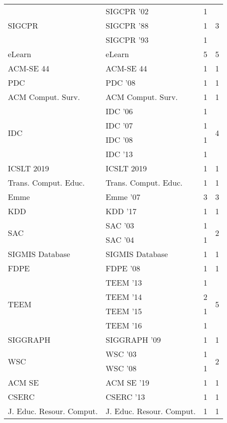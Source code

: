 \begin{table*}[t]
\begin{tabular}{llrr}
\multirow{3}{*}{SIGCPR } & SIGCPR '02 & 1 & \multirow{3}{*}{3}\\
& SIGCPR '88 & 1 &\\
& SIGCPR '93 & 1 &\\
\multirow{1}{*}{eLearn} & eLearn & 5 & \multirow{1}{*}{5}\\
\multirow{1}{*}{ACM-SE 44} & ACM-SE 44 & 1 & \multirow{1}{*}{1}\\
\multirow{1}{*}{PDC } & PDC '08 & 1 & \multirow{1}{*}{1}\\
\multirow{1}{*}{ACM Comput. Surv.} & ACM Comput. Surv. & 1 & \multirow{1}{*}{1}\\
\multirow{4}{*}{IDC } & IDC '06 & 1 & \multirow{4}{*}{4}\\
& IDC '07 & 1 &\\
& IDC '08 & 1 &\\
& IDC '13 & 1 &\\
\multirow{1}{*}{ICSLT 2019} & ICSLT 2019 & 1 & \multirow{1}{*}{1}\\
\multirow{1}{*}{Trans. Comput. Educ.} & Trans. Comput. Educ. & 1 & \multirow{1}{*}{1}\\
\multirow{1}{*}{Emme } & Emme '07 & 3 & \multirow{1}{*}{3}\\
\multirow{1}{*}{KDD } & KDD '17 & 1 & \multirow{1}{*}{1}\\
\multirow{2}{*}{SAC } & SAC '03 & 1 & \multirow{2}{*}{2}\\
& SAC '04 & 1 &\\
\multirow{1}{*}{SIGMIS Database} & SIGMIS Database & 1 & \multirow{1}{*}{1}\\
\multirow{1}{*}{FDPE } & FDPE '08 & 1 & \multirow{1}{*}{1}\\
\multirow{4}{*}{TEEM } & TEEM '13 & 1 & \multirow{4}{*}{5}\\
& TEEM '14 & 2 &\\
& TEEM '15 & 1 &\\
& TEEM '16 & 1 &\\
\multirow{1}{*}{SIGGRAPH } & SIGGRAPH '09 & 1 & \multirow{1}{*}{1}\\
\multirow{2}{*}{WSC } & WSC '03 & 1 & \multirow{2}{*}{2}\\
& WSC '08 & 1 &\\
\multirow{1}{*}{ACM SE } & ACM SE '19 & 1 & \multirow{1}{*}{1}\\
\multirow{1}{*}{CSERC } & CSERC '13 & 1 & \multirow{1}{*}{1}\\
\multirow{1}{*}{J. Educ. Resour. Comput.} & J. Educ. Resour. Comput. & 1 & \multirow{1}{*}{1}\\

\end{tabular}
\end{table*}
